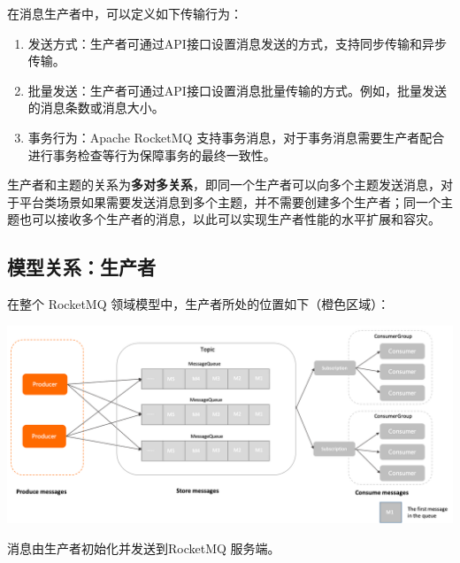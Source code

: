 \documentclass[11pt, a4paper, oneside, fontset=none]{ctexbook}
\begin{document}
在消息生产者中，可以定义如下传输行为：
\begin{enumerate}
  \item 发送方式：生产者可通过API接口设置消息发送的方式，支持同步传输和异步传输。
  \item 批量发送：生产者可通过API接口设置消息批量传输的方式。例如，批量发送的消息条数或消息大小。
  \item 事务行为：Apache RocketMQ 支持事务消息，对于事务消息需要生产者配合进行事务检查等行为保障事务的最终一致性。
\end{enumerate}

生产者和主题的关系为{\bfseries\kaishu 多对多关系}，即同一个生产者可以向多个主题发送消息，对于平台类场景如果需要发送消息到多个主题，并不需要创建多个生产者；同一个主题也可以接收多个生产者的消息，以此可以实现生产者性能的水平扩展和容灾。

\subsection{模型关系：生产者}
在整个 RocketMQ 领域模型中，生产者所处的位置如下（橙色区域）：

\begin{center}
  \begin{minipage}{\textwidth}
    \center
    \includegraphics[width=\textwidth]{picture/模型关系：生产者.png}
    \captionsetup{hypcap=false}
    \label{fig:模型关系：生产者}
  \end{minipage}
\end{center}

消息由生产者初始化并发送到RocketMQ 服务端。
\end{document}
